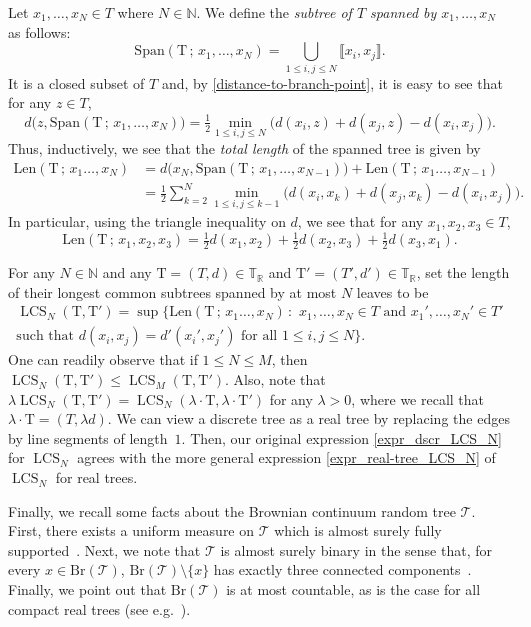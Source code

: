 \documentclass[11pt,reqno]{amsart}
\newcommand{\N}{\mathbb{N}}
\newcommand{\R}{\mathbb{R}}
\newcommand{\bbT}{\mathbb{T}}
\newcommand{\1}{\mathbf{1}}
\newcommand{\0}{\mathbf{0}}
\newcommand{\rT}{\mathrm{T}}
\newcommand{\sT}{\mathscr{T}}
\newcommand{\LCS}{\operatorname{LCS}}
\begin{document}
Let $x_1,\ldots,x_N\in T$ where $N\in \N$. We define the \emph{subtree of $T$ spanned by $x_1,\ldots,x_N$} as follows:
\[\mathrm{Span}(\rT\, ;\, x_1,\ldots,x_N)=\bigcup_{1\leq i,j\leq N}\llbracket x_i,x_j\rrbracket.\]
It is a closed subset of $T$ and, by \eqref{distance-to-branch-point}, it is easy to see that for any $z\in T$,
\[d\big(z,\mathrm{Span}(\rT\, ;\, x_1,\ldots,x_N)\big)=\tfrac{1}{2}\min_{1\leq i,j\leq N}\big(d(x_i,z)+d(x_j,z)-d(x_i,x_j)\big).\]
Thus, inductively, we see that the \emph{total length} of the spanned tree is given by
\begin{align}
\label{formula_length_span}
\mathrm{Len}(\rT\, ;\, x_1\ldots,x_N)&=d\big(x_N,\mathrm{Span}(\rT\, ;\, x_1,\ldots,x_{N-1})\big)+\mathrm{Len}(\rT\, ;\, x_1\ldots,x_{N-1})\\
\nonumber
&=\tfrac{1}{2}\sum_{k=2}^N \min_{1\leq i,j\leq k-1}\big(d(x_i,x_k)+d(x_j,x_k)-d(x_i,x_j)\big).
\end{align}
In particular, using the triangle inequality on $d$, we see that for any $x_1,x_2,x_3\in T$,
\begin{equation}
\label{formula_length_span3}
\mathrm{Len}(\rT\, ;\, x_1,x_2,x_3)=\tfrac{1}{2}d(x_1,x_2)+\tfrac{1}{2}d(x_2,x_3)+\tfrac{1}{2}d(x_3,x_1).
\end{equation}

For any $N\in\N$ and any $\rT=(T,d)\in \bbT_\R$ and $\rT'=(T',d') \in \bbT_\R$, set the length of their longest common subtrees spanned by at most $N$ leaves to be
\begin{multline}
\label{expr_real-tree_LCS_N}
\LCS_N(\rT,\rT')=\sup\big\{\mathrm{Len}(\rT\, ;\, x_1\ldots,x_N) \, : \, \, x_1,\ldots,x_N\in T\text{ and }x_1',\ldots,x_N'\in T'\\
\text{such that }  d(x_i,x_j)=d'(x_i',x_j')\text{ for all }1\leq i,j\leq N \big\}.
\end{multline}
One can readily observe that if $1\leq N\leq M$, then $\LCS_N(\rT,\rT')\leq \LCS_M(\rT,\rT')$. Also, note that $\lambda \LCS_N(\rT,\rT') = \LCS_N(\lambda\cdot \rT, \lambda\cdot \rT')$ for any $\lambda > 0$, where we recall that $\lambda\cdot \rT=(T,\lambda d)$. 
We can view a discrete tree as a real tree by replacing the edges by line segments of length~$1$. Then, our original expression \eqref{expr_dscr_LCS_N} for $\LCS_N$ agrees with the more general expression \eqref{expr_real-tree_LCS_N} of $\LCS_N$ for real trees.
\smallskip 

Finally, we recall some facts about the Brownian continuum random tree $\sT$. 
First, there exists a uniform measure on $\sT$ which is almost surely fully supported~\cite{aldous1991continuumI}. Next, we note that $\sT$ is almost surely binary in the sense that, for every $x \in \mathrm{Br}(\sT)$, $\mathrm{Br}(\sT) \setminus \{x\}$ has exactly three connected components~\cite{aldous1991continuumI}. Finally, we point out that $\mathrm{Br}(\sT)$ is at most countable, as is the case for all compact real trees (see e.g.~\cite[Lemma 3.1]{duquesne2007growth}).
\smallskip 
\end{document}
